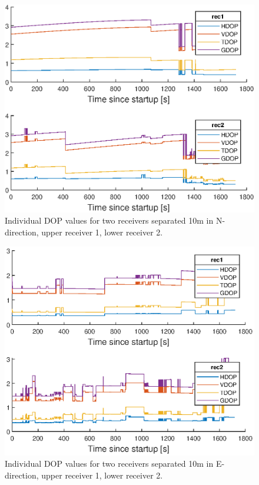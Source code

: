 \begin{figure}[!htb]
\includegraphics[width=\textwidth]{Results/DOP_N}
\caption{\label{fig:DOP1} Individual DOP values for two receivers separated 10m in N-direction, upper receiver 1, lower receiver 2.}
\end{figure}
\begin{figure}[!htb]
\includegraphics[width=\textwidth]{Results/DOP_E}
\caption{\label{fig:DOP2} Individual DOP values for two receivers separated 10m in E-direction, upper receiver 1, lower receiver 2.}
\end{figure}

